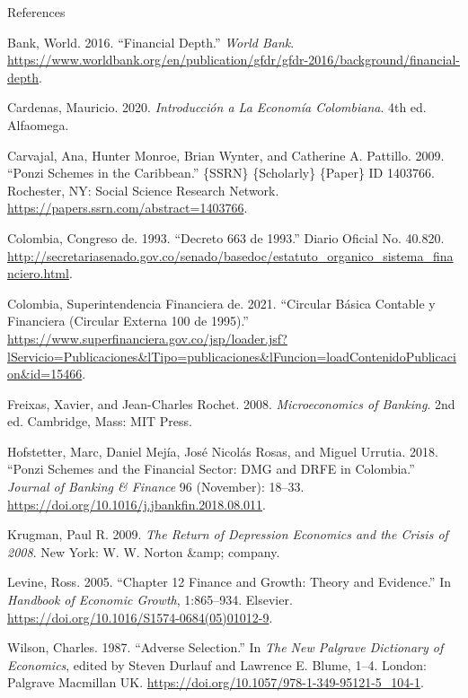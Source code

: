 \documentclass[
  ignorenonframetext,
]{beamer}
\newlength{\cslhangindent}
\newenvironment{CSLReferences}[2] %
 {\begin{list}{}{%
  \setlength{\itemindent}{0pt}
  \setlength{\leftmargin}{0pt}
  \setlength{\parsep}{0pt}
  \ifodd #1
   \setlength{\leftmargin}{\cslhangindent}
   \setlength{\itemindent}{-1\cslhangindent}
  \fi
  \setlength{\itemsep}{#2\baselineskip}}}
 {\end{list}}
\begin{document}
\begin{frame}[allowframebreaks]{References}
\label{refs}
\begin{CSLReferences}{1}{0}
Bank, World. 2016. {``Financial {Depth}.''} \emph{World Bank}.
\url{https://www.worldbank.org/en/publication/gfdr/gfdr-2016/background/financial-depth}.

Cardenas, Mauricio. 2020. \emph{Introducción a La {Economía}
{Colombiana}}. 4th ed. Alfaomega.

Carvajal, Ana, Hunter Monroe, Brian Wynter, and Catherine A. Pattillo.
2009. {``Ponzi {Schemes} in the {Caribbean}.''} \{SSRN\} \{Scholarly\}
\{Paper\} ID 1403766. Rochester, NY: Social Science Research Network.
\url{https://papers.ssrn.com/abstract=1403766}.

Colombia, Congreso de. 1993. {``Decreto 663 de 1993.''} Diario Oficial
No. 40.820.
\url{http://secretariasenado.gov.co/senado/basedoc/estatuto_organico_sistema_financiero.html}.

Colombia, Superintendencia Financiera de. 2021. {``Circular {Básica}
{Contable} y {Financiera} ({Circular} {Externa} 100 de 1995).''}
\url{https://www.superfinanciera.gov.co/jsp/loader.jsf?lServicio=Publicaciones&lTipo=publicaciones&lFuncion=loadContenidoPublicacion&id=15466}.

Freixas, Xavier, and Jean-Charles Rochet. 2008. \emph{Microeconomics of
Banking}. 2nd ed. Cambridge, Mass: MIT Press.

Hofstetter, Marc, Daniel Mejía, José Nicolás Rosas, and Miguel Urrutia.
2018. {``Ponzi Schemes and the Financial Sector: {DMG} and {DRFE} in
{Colombia}.''} \emph{Journal of Banking \& Finance} 96 (November):
18--33. \url{https://doi.org/10.1016/j.jbankfin.2018.08.011}.

Krugman, Paul R. 2009. \emph{The Return of Depression Economics and the
Crisis of 2008}. New York: W. W. Norton \&amp; company.

Levine, Ross. 2005. {``Chapter 12 {Finance} and {Growth}: {Theory} and
{Evidence}.''} In \emph{Handbook of {Economic} {Growth}}, 1:865--934.
Elsevier. \url{https://doi.org/10.1016/S1574-0684(05)01012-9}.

Wilson, Charles. 1987. {``Adverse {Selection}.''} In \emph{The {New}
{Palgrave} {Dictionary} of {Economics}}, edited by Steven Durlauf and
Lawrence E. Blume, 1--4. London: Palgrave Macmillan UK.
\url{https://doi.org/10.1057/978-1-349-95121-5_104-1}.

\end{CSLReferences}
\end{frame}
\end{document}
